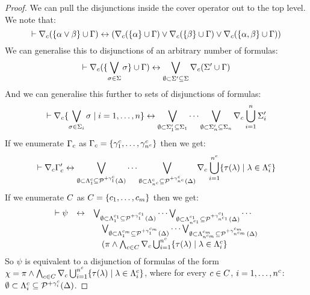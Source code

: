 \begin{proof}
We can pull the disjunctions inside the cover operator out to the top level.
We note that:
$$
\vdash \nabla_{c} (\{\alpha \lor \beta\} \cup \Gamma) \leftrightarrow (\nabla_{c} (\{\alpha\} \cup \Gamma) \lor \nabla_{c} (\{\beta\} \cup \Gamma) \lor \nabla_{c} (\{\alpha, \beta\} \cup \Gamma))
$$
We can generalise this to disjunctions of an arbitrary number of formulas:
$$
\vdash \nabla_{c} (\{\bigvee_{\sigma \in \Sigma} \sigma\} \cup \Gamma) \leftrightarrow \bigvee_{\emptyset \subset \Sigma' \subseteq \Sigma} \nabla_{c} (\Sigma' \cup \Gamma)
$$
And we can generalise this further to sets of disjunctions of formulas:
$$
\vdash \nabla_{c} \{\bigvee_{\sigma \in \Sigma_i} \sigma \mid i = 1, \dots, n\} \leftrightarrow \bigvee_{\emptyset \subset \Sigma'_1 \subseteq \Sigma_1} \cdots  \bigvee_{\emptyset \subset \Sigma'_n \subseteq \Sigma_n} \nabla_{c} \bigcup_{i = 1}^n \Sigma'_i
$$
If we enumerate $\Gamma_c$ as $\Gamma_c = \{\gamma^c_1, \dots, \gamma^c_{n^c}\}$ then we get:
$$
\vdash \nabla_{c} \Gamma'_c \leftrightarrow \bigvee_{\emptyset \subset \Lambda^c_1 \subseteq \mathcal{P}^{+\gamma^c_1}(\Delta)} \cdots \bigvee_{\emptyset \subset \Lambda^c_{n^c} \subseteq \mathcal{P}^{+\gamma^c_{n^c}}(\Delta)} \nabla_{c} \bigcup_{i = 1}^{n^c} \{\tau(\lambda) \mid \lambda \in \Lambda^c_i\}
$$
If we enumerate $C$ as $C = \{c_1, \dots, c_m\}$ then we get:
$$
\begin{array}{rcl}
\vdash \psi &\leftrightarrow& 
\bigvee_{\emptyset \subset \Lambda^{c_1}_1 \subseteq \mathcal{P}^{+\gamma^{c_1}_1}(\Delta)} \cdots 
\bigvee_{\emptyset \subset \Lambda^{c_1}_{n^{c_1}} \subseteq \mathcal{P}^{+\gamma^{c_1}_{n^{c_1}}}(\Delta)} \cdots\\&&\quad
\bigvee_{\emptyset \subset \Lambda^{c_m}_1 \subseteq \mathcal{P}^{+\gamma^{c_m}_1}(\Delta)} \cdots 
\bigvee_{\emptyset \subset \Lambda^{c_m}_{n^{c_m}} \subseteq \mathcal{P}^{+\gamma^{c_m}_{n^{c_m}}}(\Delta)} \\&&\quad
(\pi \land \bigwedge_{c \in C} \nabla_{c} \bigcup_{i = 1}^{n^c} \{\tau(\lambda) \mid \lambda \in \Lambda^c_i\}
\end{array}
$$
So $\psi$ is equivalent to a disjunction of formulas of the form $\chi = \pi \land \bigwedge_{c \in C} \nabla_{c} \bigcup_{i = 1}^{n^c} \{\tau(\lambda) \mid \lambda \in \Lambda^c_i\}$, where for every $c \in C$, $i = 1, \dots, n^c$: $\emptyset \subset \Lambda^c_i \subseteq \mathcal{P}^{+\gamma^c_i}(\Delta)$.


\end{proof}
